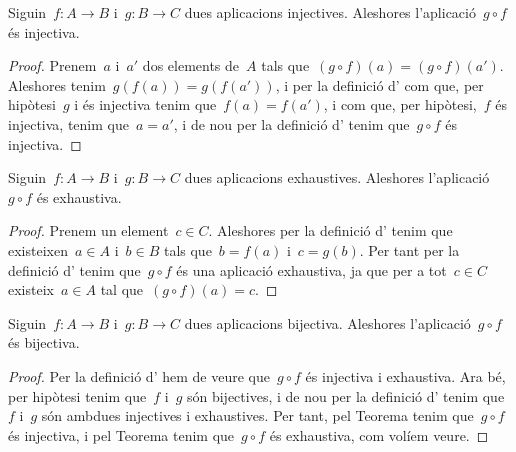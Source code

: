 \documentclass[../../Main.tex]{subfiles}
\begin{document}
	\begin{theorem}
		\label{thm:composició d'injectives injectiva}
		Siguin~\(f\colon A\rightarrow B\) i~\(g\colon B\rightarrow C\) dues aplicacions injectives.
		Aleshores l'aplicació~\(g\circ f\) és injectiva.
		\begin{proof}
			Prenem~\(a\) i~\(a'\) dos elements de~\(A\) tals que~\((g\circ f)(a)=(g\circ f)(a')\).
			Aleshores tenim~\(g(f(a))=g(f(a'))\), i per la definició d' com que, per hipòtesi~\(g\) i és injectiva tenim que~\(f(a)=f(a')\), i com que, per hipòtesi,~\(f\) és injectiva, tenim que~\(a=a'\), i de nou per la definició d' tenim que~\(g\circ f\) és injectiva.
		\end{proof}
	\end{theorem}
	\begin{theorem}
		\label{thm:composició d'exhaustives exhaustiva}
		Siguin~\(f\colon A\rightarrow B\) i~\(g\colon B\rightarrow C\) dues aplicacions exhaustives.
		Aleshores l'aplicació~\(g\circ f\) és exhaustiva.
		\begin{proof}
			Prenem un element~\(c\in C\).
			Aleshores per la definició d' tenim que existeixen~\(a\in A\) i~\(b\in B\) tals que~\(b=f(a)\) i~\(c=g(b)\).
			Per tant per la definició d' tenim que~\(g\circ f\) és una aplicació exhaustiva, ja que per a tot~\(c\in C\) existeix~\(a\in A\) tal que~\((g\circ f)(a)=c\).
		\end{proof}
	\end{theorem}
	\begin{theorem}
		\label{thm:composició de bijectives bijectiva}
		\label{thm:conjugació de bijectives bijectiva}
		Siguin~\(f\colon A\rightarrow B\) i~\(g\colon B\rightarrow C\) dues aplicacions bijectiva.
		Aleshores l'aplicació~\(g\circ f\) és bijectiva.
		\begin{proof}
			Per la definició d' hem de veure que~\(g\circ f\) és injectiva i exhaustiva.
			Ara bé, per hipòtesi tenim que~\(f\) i~\(g\) són bijectives, i de nou per la definició d' tenim que~\(f\) i~\(g\) són ambdues injectives i exhaustives.
			Per tant, pel Teorema  tenim que~\(g\circ f\) és injectiva, i pel Teorema  tenim que~\(g\circ f\) és exhaustiva, com volíem veure.
		\end{proof}
	\end{theorem}
\end{document}
